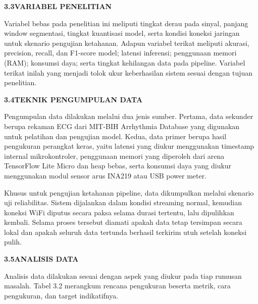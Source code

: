 \documentclass[11pt]{article}
\newcommand{\Sect}[2]{\par\vspace{8pt}\noindent\textbf{#1\quad #2}\par\vspace{3pt}}
\begin{document}
\Sect{3.3}{VARIABEL PENELITIAN}

Variabel bebas pada penelitian ini meliputi tingkat derau pada sinyal, panjang window segmentasi, tingkat kuantisasi model, serta kondisi koneksi jaringan untuk skenario pengujian ketahanan. Adapun variabel terikat meliputi akurasi, precision, recall, dan F1-score model; latensi inferensi; penggunaan memori (RAM); konsumsi daya; serta tingkat kehilangan data pada pipeline. Variabel terikat inilah yang menjadi tolok ukur keberhasilan sistem sesuai dengan tujuan penelitian.

\Sect{3.4}{TEKNIK PENGUMPULAN DATA}

Pengumpulan data dilakukan melalui dua jenis sumber. Pertama, data sekunder berupa rekaman ECG dari MIT-BIH Arrhythmia Database yang digunakan untuk pelatihan dan pengujian model. Kedua, data primer berupa hasil pengukuran perangkat keras, yaitu latensi yang diukur menggunakan timestamp internal mikrokontroler, penggunaan memori yang diperoleh dari arena TensorFlow Lite Micro dan heap bebas, serta konsumsi daya yang diukur menggunakan modul sensor arus INA219 atau USB power meter.

Khusus untuk pengujian ketahanan pipeline, data dikumpulkan melalui skenario uji reliabilitas. Sistem dijalankan dalam kondisi streaming normal, kemudian koneksi WiFi diputus secara paksa selama durasi tertentu, lalu dipulihkan kembali. Selama proses tersebut diamati apakah data tetap tersimpan secara lokal dan apakah seluruh data tertunda berhasil terkirim utuh setelah koneksi pulih.

\Sect{3.5}{ANALISIS DATA}

Analisis data dilakukan sesuai dengan aspek yang diukur pada tiap rumusan masalah. Tabel 3.2 merangkum rencana pengukuran beserta metrik, cara pengukuran, dan target indikatifnya.
\end{document}
